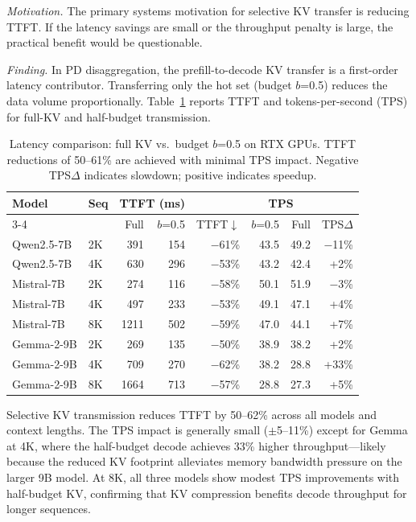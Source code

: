 \documentclass[11pt]{article}
\newcommand{\pct}{\%}
\theoremstyle{definition}
\theoremstyle{plain}
\begin{document}
\emph{Motivation.}  The primary systems motivation for selective KV transfer is reducing TTFT.  If the latency savings are small or the throughput penalty is large, the practical benefit would be questionable.

\emph{Finding.}  In PD disaggregation, the prefill-to-decode KV transfer is a first-order latency contributor.  Transferring only the hot set (budget $b$=0.5) reduces the data volume proportionally.  Table~\ref{tab:latency} reports TTFT and tokens-per-second (TPS) for full-KV and half-budget transmission.

\begin{table}[t]
\centering
\caption{Latency comparison: full KV vs.\ budget $b$=0.5 on RTX GPUs.  TTFT reductions of 50--61\pct{} are achieved with minimal TPS impact.  Negative TPS$\Delta$ indicates slowdown; positive indicates speedup.}
\label{tab:latency}
\small
\begin{tabular}{llrrrrrr}
\toprule
Model & Seq & \multicolumn{2}{c}{TTFT (ms)} & & \multicolumn{2}{c}{TPS} & \\
\cmidrule{3-4} \cmidrule{6-7}
 & & Full & $b$=0.5 & TTFT$\downarrow$ & $b$=0.5 & Full & TPS$\Delta$ \\
\midrule
Qwen2.5-7B & 2K & 391 & 154 & $-$61\pct{} & 43.5 & 49.2 & $-$11\pct{} \\
Qwen2.5-7B & 4K & 630 & 296 & $-$53\pct{} & 43.2 & 42.4 & +2\pct{} \\
\midrule
Mistral-7B & 2K & 274 & 116 & $-$58\pct{} & 50.1 & 51.9 & $-$3\pct{} \\
Mistral-7B & 4K & 497 & 233 & $-$53\pct{} & 49.1 & 47.1 & +4\pct{} \\
Mistral-7B & 8K & 1211 & 502 & $-$59\pct{} & 47.0 & 44.1 & +7\pct{} \\
\midrule
Gemma-2-9B & 2K & 269 & 135 & $-$50\pct{} & 38.9 & 38.2 & +2\pct{} \\
Gemma-2-9B & 4K & 709 & 270 & $-$62\pct{} & 38.2 & 28.8 & +33\pct{} \\
Gemma-2-9B & 8K & 1664 & 713 & $-$57\pct{} & 28.8 & 27.3 & +5\pct{} \\
\bottomrule
\end{tabular}
\end{table}

Selective KV transmission reduces TTFT by 50--62\pct{} across all models and context lengths.  The TPS impact is generally small ($\pm$5--11\pct{}) except for Gemma at 4K, where the half-budget decode achieves 33\pct{} higher throughput---likely because the reduced KV footprint alleviates memory bandwidth pressure on the larger 9B model.  At 8K, all three models show modest TPS improvements with half-budget KV, confirming that KV compression benefits decode throughput for longer sequences.
\end{document}
